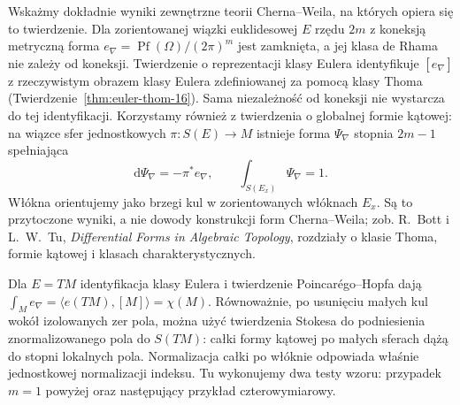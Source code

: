 Wskażmy dokładnie wyniki zewnętrzne teorii Cherna--Weila,
na których opiera się to twierdzenie. Dla zorientowanej
wiązki euklidesowej $E$ rzędu $2m$ z koneksją metryczną
forma $e_\nabla=\operatorname{Pf}(\Omega)/(2\pi)^m$
jest zamknięta, a jej klasa de Rhama nie zależy od koneksji.
Twierdzenie o reprezentacji klasy Eulera identyfikuje
$[e_\nabla]$ z rzeczywistym obrazem klasy Eulera
zdefiniowanej za pomocą klasy Thoma
(Twierdzenie~\ref{thm:euler-thom-16}).
Sama niezależność od koneksji nie wystarcza do tej
identyfikacji. Korzystamy również z twierdzenia o globalnej
formie kątowej: na wiązce sfer jednostkowych
$\pi:S(E)\to M$ istnieje forma $\Psi_\nabla$ stopnia $2m-1$
spełniająca
\[
 \mathrm d\Psi_\nabla=-\pi^*e_\nabla,\qquad
 \int_{S(E_x)}\Psi_\nabla=1.
\]
Włókna orientujemy jako brzegi kul w zorientowanych
włóknach $E_x$. Są to przytoczone wyniki, a nie dowody
konstrukcji form Cherna--Weila; zob. R.~Bott i L.~W.~Tu,
\emph{Differential Forms in Algebraic Topology},
rozdziały o klasie Thoma, formie kątowej i klasach
charakterystycznych.

Dla $E=TM$ identyfikacja klasy Eulera i twierdzenie
Poincarégo--Hopfa dają
$\int_M e_\nabla=\langle e(TM),[M]\rangle=\chi(M)$.
Równoważnie, po usunięciu małych kul wokół izolowanych
zer pola, można użyć twierdzenia Stokesa do podniesienia
znormalizowanego pola do $S(TM)$: całki formy kątowej
po małych sferach dążą do stopni lokalnych pola.
Normalizacja całki po włóknie odpowiada właśnie
jednostkowej normalizacji indeksu.
Tu wykonujemy dwa testy wzoru: przypadek $m=1$ powyżej
oraz następujący przykład czterowymiarowy.

